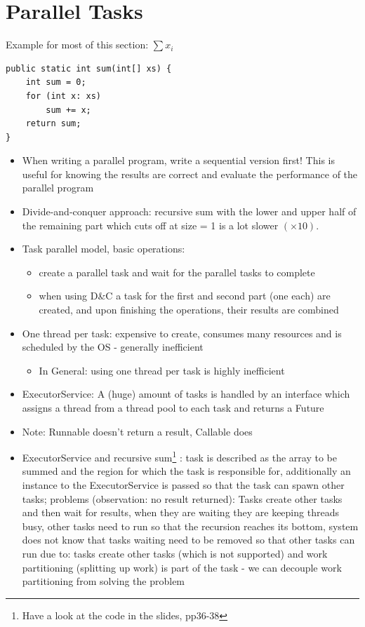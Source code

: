\documentclass[a4paper]{article}
\begin{document}
\section{Parallel Tasks}
Example for most of this section: $\sum x_i$
\begin{lstlisting}
public static int sum(int[] xs) {
	int sum = 0;
	for (int x: xs)
		sum += x;
 	return sum;
}
\end{lstlisting}
\begin{itemize}
\item When writing a parallel program, write a sequential version first! This is useful for knowing the results are correct and evaluate the performance of the parallel program
\item Divide-and-conquer approach: recursive sum with the lower and upper half of the remaining part which cuts off at size = 1 is a lot slower $(\times 10)$. 
\item Task parallel model, basic operations: 
\begin{itemize}
\item create a parallel task and wait for the parallel tasks to complete
\item  when using D\&C a task for the first and second part (one each) are created, and upon finishing the operations, their results are combined
\end{itemize}
\item One thread per task: expensive to create, consumes many resources and is scheduled by the OS - generally inefficient
\begin{itemize}
\item In General: using one thread per task is highly inefficient 
\end{itemize}
\item ExecutorService: A (huge) amount of tasks is handled by an interface which assigns a thread from a thread pool to each task and returns a Future
\item Note: Runnable doesn’t return a result, Callable does
\item ExecutorService and recursive sum\footnote{Have a look at the code in the slides, pp36-38} : task is described as the array to be summed and the region for which the task is responsible for, additionally an instance to the ExecutorService is passed so that the task can spawn other tasks; problems (observation: no result returned): Tasks create other tasks and then wait for results, when they are waiting they are keeping threads busy, other tasks need to run so that the recursion reaches its bottom, system does not know that tasks waiting need to be removed so that other tasks can run due to: tasks create other tasks (which is not supported) and work partitioning (splitting up work) is part of the task - we can decouple work partitioning from solving the problem

\end{itemize}
\end{document}
